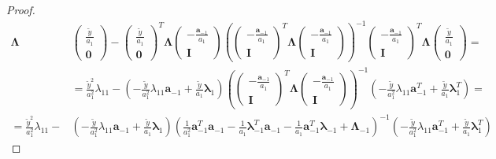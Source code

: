\documentclass[10pt,fleqn]{amsart}
\theoremstyle{definition}
\theoremstyle{remark}
\numberwithin{equation}{section}
\newcommand{\aaa}{\boldsymbol{a}}
\newcommand{\llambda}{\boldsymbol{\lambda}}
\newcommand{\LLambda}{\boldsymbol{\Lambda}}
\newcommand{\ytilde}{\widetilde{y}}
\begin{document}
\begin{proof}
\begin{equation}
\begin{split}
    \LLambda&
    \left(\begin{matrix}\frac \ytilde{a_1}\\\boldsymbol{0}\end{matrix}\right)-
    \left(\begin{matrix}\frac \ytilde{a_1}\\\boldsymbol{0}\end{matrix}\right)^T
    \LLambda
    \left(\begin{matrix}-\frac {\aaa_{-1}}{a_1}\\\boldsymbol{I}\end{matrix}\right)
    \left(
        \left(\begin{matrix}-\frac {\aaa_{-1}}{a_1}\\\boldsymbol{I}\end{matrix}\right)^T
        \LLambda
        \left(\begin{matrix}-\frac {\aaa_{-1}}{a_1}\\\boldsymbol{I}\end{matrix}\right)
    \right)^{-1}
    \left(\begin{matrix}-\frac {\aaa_{-1}}{a_1}\\\boldsymbol{I}\end{matrix}\right)^T
    \LLambda
    \left(\begin{matrix}\frac \ytilde{a_1}\\\boldsymbol{0}\end{matrix}\right)=\\
    &=\frac{\ytilde^2}{a_1^2}\lambda_{11}-\left(-\frac{\ytilde}{a_1^2}\lambda_{11}\aaa_{-1}+\frac{\ytilde}{a_1}\llambda_1\right)
    \left(
        \left(\begin{matrix}-\frac {\aaa_{-1}}{a_1}\\\boldsymbol{I}\end{matrix}\right)^T
        \LLambda
        \left(\begin{matrix}-\frac {\aaa_{-1}}{a_1}\\\boldsymbol{I}\end{matrix}\right)
    \right)^{-1}
    \left(-\frac{\ytilde}{a_1^2}\lambda_{11}\aaa_{-1}^T+\frac{\ytilde}{a_1}\llambda_1^T\right)=\\
    =\frac{\ytilde^2}{a_1^2}\lambda_{11}-&\left(-\frac{\ytilde}{a_1^2}\lambda_{11}\aaa_{-1}+\frac{\ytilde}{a_1}\llambda_1\right)
    \left(
    \frac 1{a_1^2}\aaa_{-1}^T\aaa_{-1}-\frac 1{a_1}\llambda_{-1}^T\aaa_{-1}-\frac 1{a_1}\aaa_{-1}^T\llambda_{-1}+\LLambda_{-1}
    \right)^{-1}
    \left(-\frac{\ytilde}{a_1^2}\lambda_{11}\aaa_{-1}^T+\frac{\ytilde}{a_1}\llambda_1^T\right)

\end{split}
\end{equation}
\end{proof}
\end{document}
